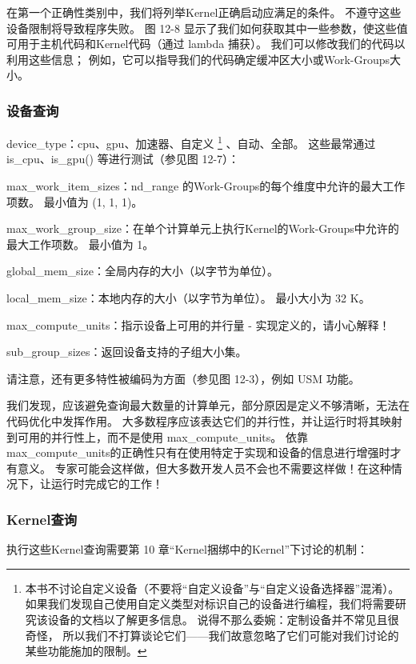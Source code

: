 在第一个正确性类别中，我们将列举Kernel正确启动应满足的条件。 不遵守这些设备限制将导致程序失败。 
图 12-8 显示了我们如何获取其中一些参数，使这些值可用于主机代码和Kernel代码（通过 lambda 捕获）。 
我们可以修改我们的代码以利用这些信息； 例如，它可以指导我们的代码确定缓冲区大小或Work-Groups大小。

\subsubsection{设备查询}
device\_type：cpu、gpu、加速器、自定义
\footnote{本书不讨论自定义设备（不要将“自定义设备”与“自定义设备选择器”混淆）。
如果我们发现自己使用自定义类型对标识自己的设备进行编程，我们将需要研究该设备的文档以了解更多信息。
说得不那么委婉：定制设备并不常见且很奇怪，
所以我们不打算谈论它们——我们故意忽略了它们可能对我们讨论的某些功能施加的限制。}
、自动、全部。 
这些最常通过 is\_cpu、is\_gpu() 等进行测试（参见图 12-7）：

max\_work\_item\_sizes：nd\_range 的Work-Groups的每个维度中允许的最大工作项数。 最小值为 (1, 1, 1)。

max\_work\_group\_size：在单个计算单元上执行Kernel的Work-Groups中允许的最大工作项数。 最小值为 1。

global\_mem\_size：全局内存的大小（以字节为单位）。

local\_mem\_size：本地内存的大小（以字节为单位）。 最小大小为 32 K。

max\_compute\_units：指示设备上可用的并行量 - 实现定义的，请小心解释！

sub\_group\_sizes：返回设备支持的子组大小集。

请注意，还有更多特性被编码为方面（参见图 12-3），例如 USM 功能。

\begin{remark}
我们发现，应该避免查询最大数量的计算单元，部分原因是定义不够清晰，无法在代码优化中发挥作用。
大多数程序应该表达它们的并行性，并让运行时将其映射到可用的并行性上，而不是使用 max\_compute\_units。
依靠max\_compute\_units的正确性只有在使用特定于实现和设备的信息进行增强时才有意义。
专家可能会这样做，但大多数开发人员不会也不需要这样做！在这种情况下，让运行时完成它的工作！
\end{remark}

\subsubsection{Kernel查询}
执行这些Kernel查询需要第 10 章“Kernel捆绑中的Kernel”下讨论的机制：

